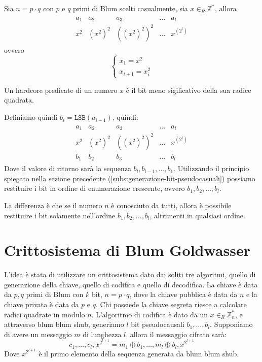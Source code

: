 Sia $n = p \cdot q$ con $p$ e $q$ primi di Blum scelti casualmente, sia 
$x \in_R \mathbb{Z}^*$, allora
\begin{align*}
  \begin{array}{lllll}
    a_1 & a_2 & a_3 & \dots & a_l \\
    x^2 & (x^2)^2 & ((x^2)^2)^2 & \dots & x^{(2^l)}
  \end{array}
\end{align*}
ovvero
\[
  \begin{cases}
    x_1 = x^2\\
    x_{i+1} = x_i^2
  \end{cases}  
\]
\begin{theorem}
  Un hardcore predicate di un numero $x$ è il bit meno sigificativo della sua radice quadrata.
\end{theorem}
Definiamo quindi $b_i = \texttt{LSB}(a_{i-1})$, quindi:
\begin{align*}
  \begin{array}{lllll}
    a_1 & a_2 & a_3 & \dots & a_l \\
    x^2 & (x^2)^2 & ((x^2)^2)^2 & \dots & x^{(2^l)}\\
    b_1 & b_2 & b_3 & \dots & b_l
  \end{array}
\end{align*}
Dove il valore di ritorno sarà la sequenza $b_l, b_{l-1}, \dots, b_1$.
Utilizzando il principio spiegato nella sezione precedente (\ref{subs:generazione-bit-pseudocasuali}) 
possiamo restituire i bit in ordine di enumerazione crescente, ovvero $b_1, b_2, \dots, b_l$.

La differenza è che se il numero $n$ è conosciuto da tutti, allora è possibile restituire i bit solamente 
nell'ordine $b_1, b_2, \dots, b_l$, altrimenti in qualsiasi ordine.

\section{Crittosistema di Blum Goldwasser}
L'idea è stata di utilizzare un crittosistema dato dai soliti tre algoritmi, quello di generazione 
della chiave, quello di codifica e quello di decodifica.
La chiave è data da $p, q$ primi di Blum con $k$ bit, $n = p \cdot q$, dove la chiave pubblica 
è data da $n$ e la chiave privata è data da $p$ e $q$.
Chi possiede la chiave segreta riesce a calcolare radici quadrate in modulo $n$. L'algoritmo 
di codifica è dato da un $x\in_R \mathbb{Z}_n^*$, e attraverso blum blum shub, generiamo 
$l$ bit pseudocausali $b_1, \dots, b_l$. Supponiamo di avere un messaggio $m$ di lunghezza $l$,
allora il messaggio cifrato sarà:
\[
  c_1, \dots, c_l, x^{2^{l+1}} = m_1 \oplus b_1, \dots, m_l \oplus b_l, x^{2^{l+1}}
\]
Dove $x^{2^{l+1}}$ è il primo elemento della sequenza generata da blum blum shub.

